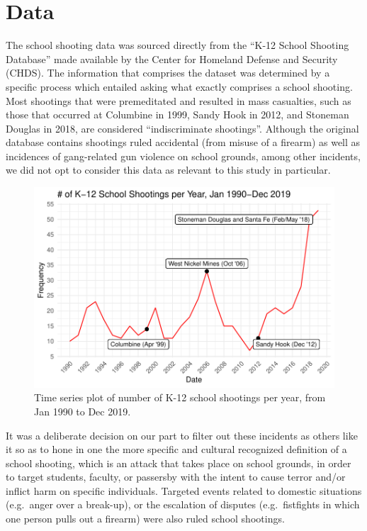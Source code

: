 \documentclass[12pt]{article}
\begin{document}
\hypertarget{data}{%
\section{Data}\label{data}}

The school shooting data was sourced directly from the ``K-12 School Shooting Database'' made available by the Center for Homeland Defense and Security (CHDS). The information that comprises the dataset was determined by a specific process which entailed asking what exactly comprises a school shooting. Most shootings that were premeditated and resulted in mass casualties, such as those that occurred at Columbine in 1999, Sandy Hook in 2012, and Stoneman Douglas in 2018, are considered ``indiscriminate shootings''. Although the original database contains shootings ruled accidental (from misuse of a firearm) as well as incidences of gang-related gun violence on school grounds, among other incidents, we did not opt to consider this data as relevant to this study in particular.

\begin{figure}
\centering
\includegraphics{JStevenRaquel_STATS295_Final_files/figure-latex/ts-plot-1990-2019-1.pdf}
\caption{\label{fig:ts-plot-1990-2019}Time series plot of number of K-12 school shootings per year, from Jan 1990 to Dec 2019.}
\end{figure}

It was a deliberate decision on our part to filter out these incidents as others like it so as to hone in one the more specific and cultural recognized definition of a school shooting, which is an attack that takes place on school grounds, in order to target students, faculty, or passersby with the intent to cause terror and/or inflict harm on specific individuals. Targeted events related to domestic situations (e.g.~anger over a break-up), or the escalation of disputes (e.g.~fistfights in which one person pulls out a firearm) were also ruled school shootings.
\end{document}
